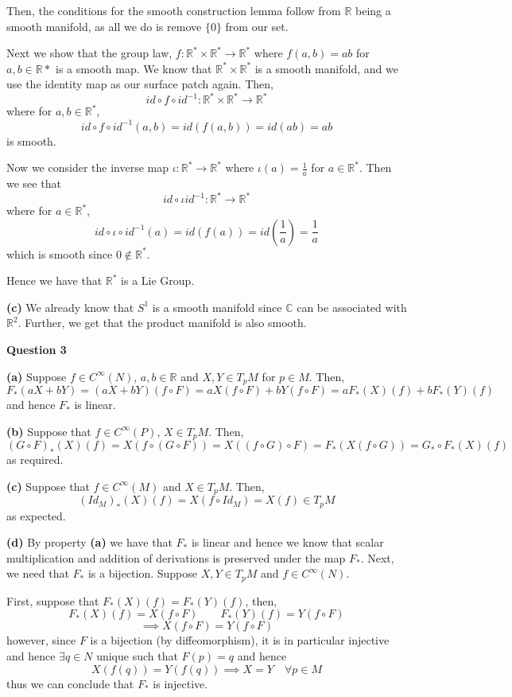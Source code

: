 \documentclass[10pt]{article}
\newcommand{\R}{\mathbb{R}}
\newcommand{\C}{\mathbb{C}}
\begin{document}
Then, the conditions for the smooth construction lemma follow from $\R$ being a smooth manifold, as all we do is remove $\{0\}$ from our set.

Next we show that the group law, $f: \R^{*}\times \R^{*} \to \R^{*}$ where $f(a,b) = ab$ for $a,b\in \R{*}$ is a smooth map. We know that $\R^{*}\times \R^{*}$ is a smooth manifold, and we use the identity map as our surface patch again. Then,
$$id \circ f \circ id^{-1}: \R^{*}\times\R^{*} \to \R^{*}$$
where for $a,b\in \R^{*}$,
$$id \circ f \circ id^{-1}(a,b) = id(f(a,b)) = id(ab) = ab$$
is smooth.

Now we consider the inverse map $\iota : \R^{*} \to \R^{*}$ where $\iota(a) = \frac{1}{a}$ for $a\in \R^{*}$. Then we see that
$$id \circ \iota id^{-1}: \R^{*} \to \R^{*}$$
where for $a \in \R^{*}$,
$$id \circ \iota \circ id^{-1}(a) = id(f(a)) = id\left(\frac{1}{a}\right) = \frac{1}{a}$$
which is smooth since $0 \notin \R^{*}$.

Hence we have that $\R^{*}$ is a Lie Group.

\textbf{(c)} We already know that $S^{1}$ is a smooth manifold since $\C$ can be associated with $\R^{2}$. Further, we get that the product manifold is also smooth. 
\newpage

\textbf{Question 3}

\textbf{(a)} Suppose $f\in C^{\infty}(N)$, $a,b \in \R$ and $X,Y\in T_{p}M$ for $p\in M$. Then,
$$F_{*}(aX + bY) = (aX + bY)(f\circ F) = aX(f\circ F) + bY(f\circ F) = aF_{*}(X)(f) + bF_{*}(Y)(f)$$
and hence $F_{*}$ is linear.

\textbf{(b)} Suppose that $f\in C^{\infty}(P)$, $X\in T_{p}M$. Then,
$$(G\circ F)_{*}(X)(f) = X(f\circ (G\circ F)) = X((f\circ G)\circ F) = F_{*}(X(f\circ G)) = G_{*}\circ F_{*}(X)(f)$$
as required.

\textbf{(c)} Suppose that $f\in C^{\infty}(M)$ and $X\in T_{p}M$. Then,
$$(Id_{M})_{*}(X)(f) = X(f\circ Id_{M}) = X(f) \in T_{p}M$$
as expected.

\textbf{(d)} By property \textbf{(a)} we have that $F_{*}$ is linear and hence we know that scalar multiplication and addition of derivations is preserved under the map $F_{*}$. Next, we need that $F_{*}$ is a bijection. Suppose $X,Y\in T_{p}M$ and $f\in C^{\infty}(N)$. 

First, suppose that $F_{*}(X)(f) = F_{*}(Y)(f)$, then,
$$F_{*}(X)(f) = X(f\circ F) \hspace{2em} F_{*}(Y)(f) = Y(f\circ F)$$
$$\implies X(f\circ F) = Y(f\circ F)$$
however, since $F$ is a bijection (by diffeomorphism), it is in particular injective and hence $\exists q \in N$ unique such that $F(p) = q$ and hence 
$$X(f(q)) = Y(f(q))\implies X = Y \hspace{1em}\forall p\in M$$
thus we can conclude that $F_{*}$ is injective.
\end{document}
